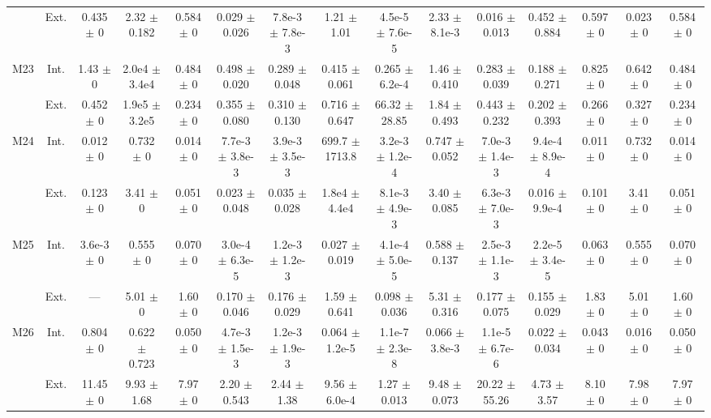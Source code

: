 \begin{table}[htbp]
{\begin{tabular}{@{}ccccccccccccccc@{}}
 & Ext. & 0.435 $\pm$ 0 & 2.32 $\pm$ 0.182 & 0.584 $\pm$ 0 & 0.029 $\pm$ 0.026 & 7.8e-3 $\pm$ 7.8e-3 & 1.21 $\pm$ 1.01 & 4.5e-5 $\pm$ 7.6e-5 & 2.33 $\pm$ 8.1e-3 & 0.016 $\pm$ 0.013 & 0.452 $\pm$ 0.884 & 0.597 $\pm$ 0 & 0.023 $\pm$ 0 & 0.584 $\pm$ 0 \\
\cline{2-15}
\multirow{2}{*}{M23} & Int. & 1.43 $\pm$ 0 & 2.0e4 $\pm$ 3.4e4 & 0.484 $\pm$ 0 & 0.498 $\pm$ 0.020 & 0.289 $\pm$ 0.048 & 0.415 $\pm$ 0.061 & 0.265 $\pm$ 6.2e-4 & 1.46 $\pm$ 0.410 & 0.283 $\pm$ 0.039 & 0.188 $\pm$ 0.271 & 0.825 $\pm$ 0 & 0.642 $\pm$ 0 & 0.484 $\pm$ 0 \\
 & Ext. & 0.452 $\pm$ 0 & 1.9e5 $\pm$ 3.2e5 & 0.234 $\pm$ 0 & 0.355 $\pm$ 0.080 & 0.310 $\pm$ 0.130 & 0.716 $\pm$ 0.647 & 66.32 $\pm$ 28.85 & 1.84 $\pm$ 0.493 & 0.443 $\pm$ 0.232 & 0.202 $\pm$ 0.393 & 0.266 $\pm$ 0 & 0.327 $\pm$ 0 & 0.234 $\pm$ 0 \\
\cline{2-15}
\multirow{2}{*}{M24} & Int. & 0.012 $\pm$ 0 & 0.732 $\pm$ 0 & 0.014 $\pm$ 0 & 7.7e-3 $\pm$ 3.8e-3 & 3.9e-3 $\pm$ 3.5e-3 & 699.7 $\pm$ 1713.8 & 3.2e-3 $\pm$ 1.2e-4 & 0.747 $\pm$ 0.052 & 7.0e-3 $\pm$ 1.4e-3 & 9.4e-4 $\pm$ 8.9e-4 & 0.011 $\pm$ 0 & 0.732 $\pm$ 0 & 0.014 $\pm$ 0 \\
 & Ext. & 0.123 $\pm$ 0 & 3.41 $\pm$ 0 & 0.051 $\pm$ 0 & 0.023 $\pm$ 0.048 & 0.035 $\pm$ 0.028 & 1.8e4 $\pm$ 4.4e4 & 8.1e-3 $\pm$ 4.9e-3 & 3.40 $\pm$ 0.085 & 6.3e-3 $\pm$ 7.0e-3 & 0.016 $\pm$ 9.9e-4 & 0.101 $\pm$ 0 & 3.41 $\pm$ 0 & 0.051 $\pm$ 0 \\
\cline{2-15}
\multirow{2}{*}{M25} & Int. & 3.6e-3 $\pm$ 0 & 0.555 $\pm$ 0 & 0.070 $\pm$ 0 & 3.0e-4 $\pm$ 6.3e-5 & 1.2e-3 $\pm$ 1.2e-3 & 0.027 $\pm$ 0.019 & 4.1e-4 $\pm$ 5.0e-5 & 0.588 $\pm$ 0.137 & 2.5e-3 $\pm$ 1.1e-3 & 2.2e-5 $\pm$ 3.4e-5 & 0.063 $\pm$ 0 & 0.555 $\pm$ 0 & 0.070 $\pm$ 0 \\
 & Ext. & --- & 5.01 $\pm$ 0 & 1.60 $\pm$ 0 & 0.170 $\pm$ 0.046 & 0.176 $\pm$ 0.029 & 1.59 $\pm$ 0.641 & 0.098 $\pm$ 0.036 & 5.31 $\pm$ 0.316 & 0.177 $\pm$ 0.075 & 0.155 $\pm$ 0.029 & 1.83 $\pm$ 0 & 5.01 $\pm$ 0 & 1.60 $\pm$ 0 \\
\cline{2-15}
\multirow{2}{*}{M26} & Int. & 0.804 $\pm$ 0 & 0.622 $\pm$ 0.723 & 0.050 $\pm$ 0 & 4.7e-3 $\pm$ 1.5e-3 & 1.2e-3 $\pm$ 1.9e-3 & 0.064 $\pm$ 1.2e-5 & 1.1e-7 $\pm$ 2.3e-8 & 0.066 $\pm$ 3.8e-3 & 1.1e-5 $\pm$ 6.7e-6 & 0.022 $\pm$ 0.034 & 0.043 $\pm$ 0 & 0.016 $\pm$ 0 & 0.050 $\pm$ 0 \\
 & Ext. & 11.45 $\pm$ 0 & 9.93 $\pm$ 1.68 & 7.97 $\pm$ 0 & 2.20 $\pm$ 0.543 & 2.44 $\pm$ 1.38 & 9.56 $\pm$ 6.0e-4 & 1.27 $\pm$ 0.013 & 9.48 $\pm$ 0.073 & 20.22 $\pm$ 55.26 & 4.73 $\pm$ 3.57 & 8.10 $\pm$ 0 & 7.98 $\pm$ 0 & 7.97 $\pm$ 0 \\

\end{tabular}}
\end{table}
